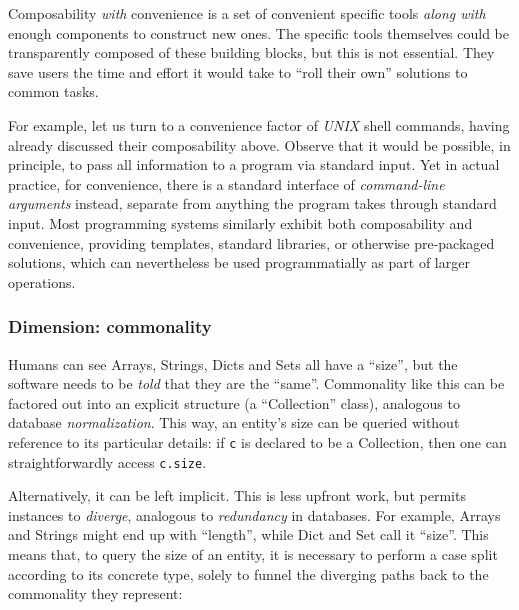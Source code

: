 \documentclass[english,submission]{programming}
\begin{document}
Composability \emph{with} convenience is a set of convenient specific
tools \emph{along with} enough components to construct new ones. The
specific tools themselves could be transparently composed of these
building blocks, but this is not essential. They save users the time and
effort it would take to ``roll their own'' solutions to common tasks.

For example, let us turn to a convenience factor of \emph{UNIX} shell
commands, having already discussed their composability above. Observe
that it would be possible, in principle, to pass all information to a
program via standard input. Yet in actual practice, for convenience,
there is a standard interface of \emph{command-line arguments} instead,
separate from anything the program takes through standard input. Most
programming systems similarly exhibit both composability and
convenience, providing templates, standard libraries, or otherwise
pre-packaged solutions, which can nevertheless be used programmatially
as part of larger operations.


\hypertarget{dimension-commonality}{%
\subsubsection{Dimension: commonality}\label{dimension-commonality}}


Humans can see Arrays, Strings, Dicts and Sets all have a ``size'', but
the software needs to be \emph{told} that they are the ``same''.
Commonality like this can be factored out into an explicit structure (a
``Collection'' class), analogous to database \emph{normalization}. This
way, an entity's size can be queried without reference to its particular
details: if \texttt{c} is declared to be a Collection, then one can
straightforwardly access \texttt{c.size}.

Alternatively, it can be left implicit. This is less upfront work, but
permits instances to \emph{diverge}, analogous to \emph{redundancy} in
databases. For example, Arrays and Strings might end up with ``length'',
while Dict and Set call it ``size''. This means that, to query the size
of an entity, it is necessary to perform a case split according to its
concrete type, solely to funnel the diverging paths back to the
commonality they represent:
\end{document}

